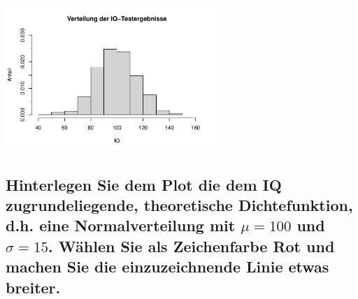 \documentclass[12pt,a4paper]{article}
\begin{document}
\begin{center}\includegraphics[width=300px]{solution_3_files/figure-latex/unnamed-chunk-12-1} \end{center}

\hypertarget{hinterlegen-sie-dem-plot-die-dem-iq-zugrundeliegende-theoretische-dichtefunktion-d.h.-eine-normalverteilung-mit-mu100-und-sigma15.-wuxe4hlen-sie-als-zeichenfarbe-rot-und-machen-sie-die-einzuzeichnende-linie-etwas-breiter.}{%
\subsection{\texorpdfstring{Hinterlegen Sie dem Plot die dem IQ
zugrundeliegende, theoretische Dichtefunktion, d.h. eine
Normalverteilung mit \(\mu=100\) und \(\sigma=15\). Wählen Sie als
Zeichenfarbe Rot und machen Sie die einzuzeichnende Linie etwas
breiter.}{Hinterlegen Sie dem Plot die dem IQ zugrundeliegende, theoretische Dichtefunktion, d.h. eine Normalverteilung mit \textbackslash mu=100 und \textbackslash sigma=15. Wählen Sie als Zeichenfarbe Rot und machen Sie die einzuzeichnende Linie etwas breiter.}}\label{hinterlegen-sie-dem-plot-die-dem-iq-zugrundeliegende-theoretische-dichtefunktion-d.h.-eine-normalverteilung-mit-mu100-und-sigma15.-wuxe4hlen-sie-als-zeichenfarbe-rot-und-machen-sie-die-einzuzeichnende-linie-etwas-breiter.}}
\end{document}
